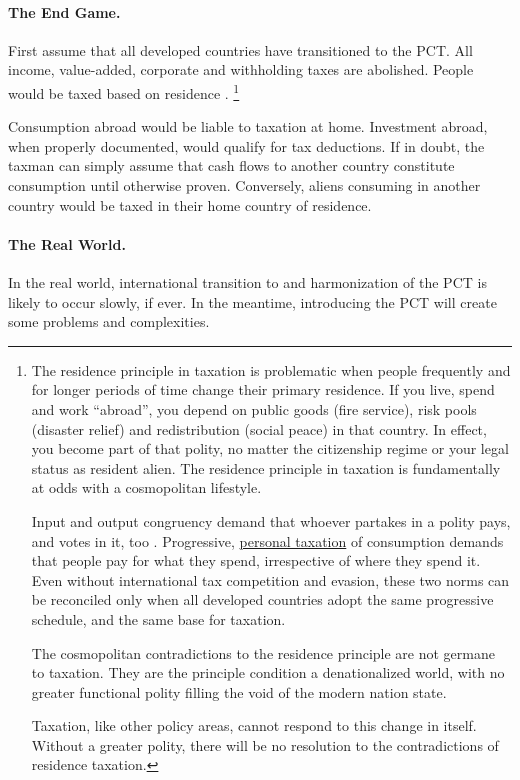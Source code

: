 \paragraph{The End Game.}
First assume that all developed countries have transitioned to the PCT.
All income, value-added, corporate and withholding taxes are abolished.
People would be taxed based on residence \citep[1645]{Graetz2009}.
\footnote{
	The residence principle in taxation is problematic when people frequently and for longer periods of time change their primary residence.
	If you live, spend and work ``abroad'', you depend on public goods (fire service), risk pools (disaster relief) and redistribution (social peace) in that country.
	In effect, you become part of that polity, no matter the citizenship regime or your legal status as resident alien.
	The residence principle in taxation is fundamentally at odds with a cosmopolitan lifestyle.

	Input and output congruency demand that whoever partakes in a polity pays, and votes in it, too \citep{Zurn-2000-aa}.
	Progressive, \hyperref[des:PersonalTaxation]{personal taxation} of consumption demands that people pay for what they spend, irrespective of where they spend it.
	Even without international tax competition and evasion, these two norms can be reconciled only when all developed countries adopt the same progressive schedule, and the same base for taxation.

	The cosmopolitan contradictions to the residence principle are not germane to taxation.
	They are the principle condition a denationalized world, with no greater functional polity filling the void of the modern nation state.

	Taxation, like other policy areas, cannot respond to this change in itself.
	Without a greater polity, there will be no resolution to the contradictions of residence taxation.
}

Consumption abroad would be liable to taxation at home.
Investment abroad, when properly documented, would qualify for tax deductions.
If in doubt, the taxman can simply assume that cash flows to another country constitute consumption until otherwise proven.
Conversely, aliens consuming in another country would be taxed in their home country of residence.

\paragraph{The Real World.}
In the real world, international transition to and harmonization of the PCT is likely to occur slowly, if ever.
In the meantime, introducing the PCT will create some problems and complexities.

